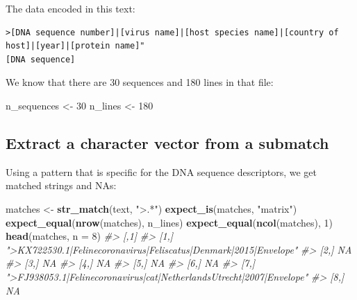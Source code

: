 \documentclass[]{book}
\newenvironment{Shaded}{}{}
\newcommand{\CommentTok}[1]{\textcolor[rgb]{0.38,0.63,0.69}{\textit{#1}}}
\newcommand{\DataTypeTok}[1]{\textcolor[rgb]{0.56,0.13,0.00}{#1}}
\newcommand{\DecValTok}[1]{\textcolor[rgb]{0.25,0.63,0.44}{#1}}
\newcommand{\KeywordTok}[1]{\textcolor[rgb]{0.00,0.44,0.13}{\textbf{#1}}}
\newcommand{\NormalTok}[1]{#1}
\newcommand{\StringTok}[1]{\textcolor[rgb]{0.25,0.44,0.63}{#1}}
\begin{document}
The data encoded in this text:

\begin{verbatim}
>[DNA sequence number]|[virus name]|[host species name]|[country of host]|[year]|[protein name]"
[DNA sequence]
\end{verbatim}

We know that there are 30 sequences and 180 lines in that file:

\begin{Shaded}
\begin{Highlighting}[]
\NormalTok{n_sequences <-}\StringTok{ }\DecValTok{30}
\NormalTok{n_lines <-}\StringTok{ }\DecValTok{180}
\end{Highlighting}
\end{Shaded}

\hypertarget{extract-a-character-vector-from-a-submatch}{%
\subsection{Extract a character vector from a submatch}\label{extract-a-character-vector-from-a-submatch}}

Using a pattern that is specific for the DNA sequence descriptors,
we get matched strings and NAs:

\begin{Shaded}
\begin{Highlighting}[]
\NormalTok{matches <-}\StringTok{ }\KeywordTok{str_match}\NormalTok{(text, }\StringTok{">.*"}\NormalTok{)}
\KeywordTok{expect_is}\NormalTok{(matches, }\StringTok{"matrix"}\NormalTok{)}
\KeywordTok{expect_equal}\NormalTok{(}\KeywordTok{nrow}\NormalTok{(matches), n_lines)}
\KeywordTok{expect_equal}\NormalTok{(}\KeywordTok{ncol}\NormalTok{(matches), }\DecValTok{1}\NormalTok{)}
\KeywordTok{head}\NormalTok{(matches, }\DataTypeTok{n =} \DecValTok{8}\NormalTok{)}
\CommentTok{#>      [,1]                                                                }
\CommentTok{#> [1,] ">KX722530.1|Felinecoronavirus|Feliscatus|Denmark|2015|Envelope"    }
\CommentTok{#> [2,] NA                                                                  }
\CommentTok{#> [3,] NA                                                                  }
\CommentTok{#> [4,] NA                                                                  }
\CommentTok{#> [5,] NA                                                                  }
\CommentTok{#> [6,] NA                                                                  }
\CommentTok{#> [7,] ">FJ938053.1|Felinecoronavirus|cat|NetherlandsUtrecht|2007|Envelope"}
\CommentTok{#> [8,] NA}
\end{Highlighting}
\end{Shaded}
\end{document}
